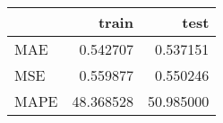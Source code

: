 \begin{tabular}{lrr}
\toprule
{} &      train &       test \\
\midrule
MAE  &   0.542707 &   0.537151 \\
MSE  &   0.559877 &   0.550246 \\
MAPE &  48.368528 &  50.985000 \\
\bottomrule
\end{tabular}
